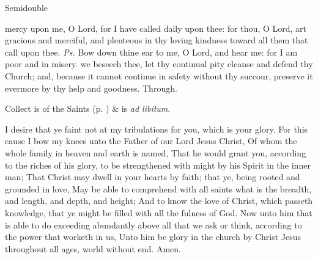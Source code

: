 \begin{inhead}
{Semidouble}
\end{inhead}
\par\noindent
{}




\properantiphonfix

\introit
{} mercy upon me, O Lord, for I have called daily upon thee: for thou, O Lord, art gracious and merciful, and plenteous in thy loving kindness toward all them that call upon thee. \textit{Ps.} Bow down thine ear to me, O Lord, and hear me: for I am poor and in misery.
\collect
{} we beseech thee, let thy continual pity cleanse and defend thy Church; and, because it cannot continue in safety without thy succour, preserve it evermore by thy help and goodness. Through.
\begin{rubric}
     Collect is of the Saints (p. \pageref{SPSaints}) \&  is \emph{ad libitum}.
\end{rubric}

 I desire that ye faint not at my tribulations for you, which is your glory. For this cause I bow my knees unto the Father of our Lord Jesus Christ, Of whom the whole family in heaven and earth is named, That he would grant you, according to the riches of his glory, to be strengthened with might by his Spirit in the inner man; That Christ may dwell in your hearts by faith; that ye, being rooted and grounded in love, May be able to comprehend with all saints what is the breadth, and length, and depth, and height; And to know the love of Christ, which passeth knowledge, that ye might be filled with all the fulness of God. Now unto him that is able to do exceeding abundantly above all that we ask or think, according to the power that worketh in us, Unto him be glory in the church by Christ Jesus throughout all ages, world without end. Amen.


